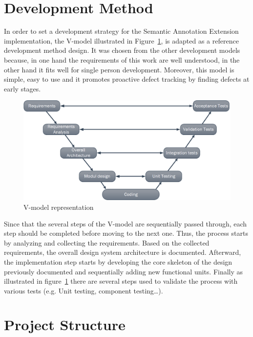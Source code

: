 \section{Development Method}
In order to set a development strategy for the Semantic Annotation Extension implementation, the V-model illustrated in Figure~\ref{fig:contrib2:v}, is adapted as a reference development method design. It was chosen from the other development models because, in one hand the requirements of this work are well understood, in the other hand it fits well for single person development. Moreover, this model is simple, easy to use and it promotes proactive defect tracking by finding defects at early stages. \par 
\begin{figure}[htbp]
    \centering
    \includegraphics[width=1\textwidth]{resources/images/vmodel}
    \caption{V-model representation}\label{fig:contrib2:v}
\end{figure}
Since that the several steps of the V-model are sequentially passed through, each step should be completed before moving to the next one. Thus, the process starts by analyzing and collecting the requirements. Based on the collected requirements, the overall design system architecture is documented. Afterward, the implementation step starts by developing the core skeleton of the design previously documented and sequentially adding new functional units. Finally as illustrated in figure~\ref{fig:contrib2:v} there are several steps used to validate the process with various tests (e.g. Unit testing, component testing\ldots).

\section{Project Structure}


